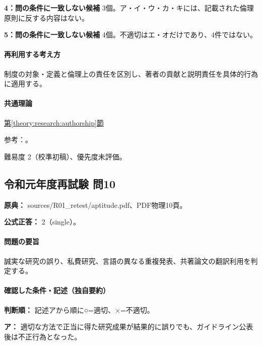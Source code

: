 \noindent\textbf{4：問の条件に一致しない候補} 3個。ア・イ・ウ・カ・キには、記載された倫理原則に反する内容はない。\par

\noindent\textbf{5：問の条件に一致しない候補} 4個。不適切はエ・オだけであり、4件ではない。\par

\paragraph{再利用する考え方} 制度の対象・定義と倫理上の責任を区別し、著者の貢献と説明責任を具体的行為に適用する。

\paragraph{共通理論} \hyperref[theory:research:authorship]{第\ref*{theory:research:authorship}節}

\par 参考：\cite{jsps_integrity2025}。

\par 難易度 2（校準初稿）、優先度未評価。

\subsection{令和元年度再試験 問10}
\label{q:r01-ret-apt-10}

\noindent\textbf{原典：} sources/R01\_retest/aptitude.pdf、PDF物理10頁。

\textbf{公式正答：} 2（single）。

\paragraph{問題の要旨} 誠実な研究の誤り、私費研究、言語の異なる重複発表、共著論文の翻訳利用を判定する。

\paragraph{確認した条件・記述（独自要約）}\mbox{}\par

\noindent\textbf{判断順：} 記述アから順に○=適切、×=不適切。\par

\noindent\textbf{ア：} 適切な方法で正当に得た研究成果が結果的に誤りでも、ガイドライン公表後は不正行為となった。\par

